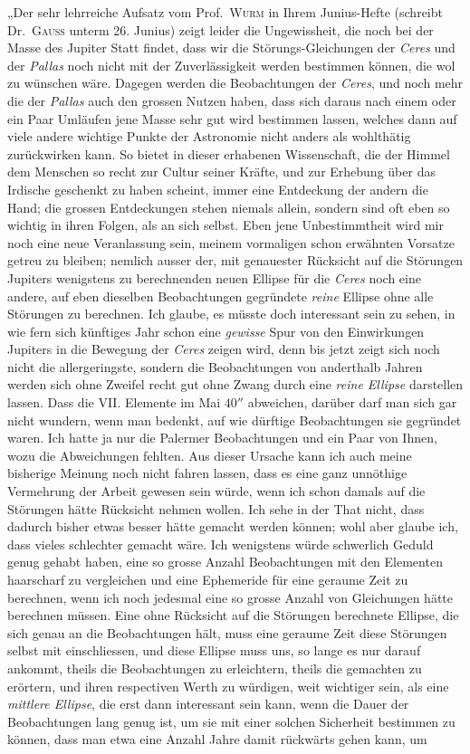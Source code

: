 \indent „Der sehr lehrreiche Aufsatz vom Prof.\ \textsc{Wurm} in Ihrem Junius-Hefte (schreibt Dr.\ \textsc{Gauss} unterm 26. Junius) zeigt leider die Ungewissheit, die noch bei der Masse des Jupiter Statt findet, dass wir die Störungs-Gleichungen der \textit{Ceres} und der \textit{Pallas} noch nicht mit der Zuverlässigkeit werden bestimmen können, die wol zu wünschen wäre. Dagegen werden die Beobachtungen der \textit{Ceres}, und noch mehr die der \textit{Pallas} auch den grossen Nutzen haben, dass sich daraus nach einem oder ein Paar Umläufen jene Masse sehr gut wird bestimmen lassen, welches dann auf viele andere wichtige Punkte der Astronomie nicht anders als wohlthätig zurückwirken kann. So bietet in dieser erhabenen Wissenschaft, die der Himmel dem Menschen so recht zur Cultur seiner Kräfte, und zur Erhebung über das Irdische geschenkt zu haben scheint, immer eine Entdeckung der andern die Hand; die grossen Entdeckungen stehen niemals allein, sondern sind oft eben so wichtig in ihren Folgen, als an sich selbst. Eben jene Unbestimmtheit wird mir noch eine neue Veranlassung sein, meinem vormaligen schon erwähnten Vorsatze getreu zu bleiben; nemlich ausser der, mit genauester Rücksicht auf die Störungen Jupiters wenigstens zu berechnenden neuen Ellipse für die \textit{Ceres} noch eine andere, auf eben dieselben Beobachtungen gegründete \textit{reine} Ellipse ohne alle Störungen zu berechnen. Ich glaube, es müsste doch interessant sein zu sehen, in wie fern sich künftiges Jahr schon eine \textit{gewisse} Spur von den Einwirkungen Jupiters in die Bewegung der \textit{Ceres} zeigen wird, denn bis jetzt zeigt sich noch nicht die allergeringste, sondern die Beobachtungen von anderthalb Jahren werden sich ohne Zweifel recht gut ohne Zwang durch eine \textit{reine Ellipse} darstellen lassen. Dass die VII. Elemente im Mai $40''$ abweichen, darüber darf man sich gar nicht wundern, wenn man bedenkt, auf wie dürftige Beobachtungen sie gegründet waren. Ich hatte ja nur die Palermer Beobachtungen und ein Paar von Ihnen, wozu die Abweichungen fehlten. Aus dieser Ursache kann ich auch meine bisherige Meinung noch nicht fahren lassen, dass es eine ganz unnöthige Vermehrung der Arbeit gewesen sein würde, wenn ich schon damals auf die Störungen hätte Rücksicht nehmen wollen. Ich sehe in der That nicht, dass dadurch bisher etwas besser hätte gemacht werden können; wohl aber glaube ich, dass vieles schlechter gemacht wäre. Ich wenigstens würde schwerlich Geduld genug gehabt haben, eine so grosse Anzahl Beobachtungen mit den Elementen haarscharf zu vergleichen und eine Ephemeride für eine geraume Zeit zu berechnen, wenn ich noch jedesmal eine so grosse Anzahl von Gleichungen hätte berechnen müssen. Eine ohne Rücksicht auf die Störungen berechnete Ellipse, die sich genau an die Beobachtungen hält, muss eine geraume Zeit diese Störungen selbst mit einschliessen, und diese Ellipse muss uns, so lange es nur darauf ankommt, theils die Beobachtungen zu erleichtern, theils die gemachten zu erörtern, und ihren respectiven Werth zu würdigen, weit wichtiger sein, als eine \textit{mittlere Ellipse}, die erst dann interessant sein kann, wenn die Dauer der Beobachtungen lang genug ist, um sie mit einer solchen Sicherheit bestimmen zu können, dass man etwa eine Anzahl Jahre damit rückwärts gehen kann, um 